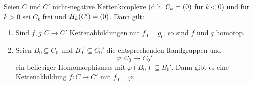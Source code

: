 \begin{lemma}
  Seien $C$ und $C'$ nicht-negative Kettenkomplexe (d.h. $C_k = (0)$ für $k < 0$) und für $k > 0$ sei $C_k$ frei und $H_k(C') = (0)$.
  Dann gilt:
  \begin{enumerate}
    \item
      Sind $f,g \colon C \to C'$ Kettenabbildungen mit $f_0 = g_0$, so sind $f$ und $g$ homotop.
    \item
      Seien $B_0 \subseteq C_0$ und $B_0' \subseteq C_0'$ die entsprechenden Randgruppen und
      \begin{equation*}
        \varphi \colon C_0 \to C_0'
      \end{equation*}
      ein beliebiger Homomorphismus mit $\varphi(B_0) \subseteq B_0'$.
      Dann gibt es eine Kettenabbildung $f \colon C \to C'$ mit $f_0 = \varphi$.
  \end{enumerate}
\end{lemma}

